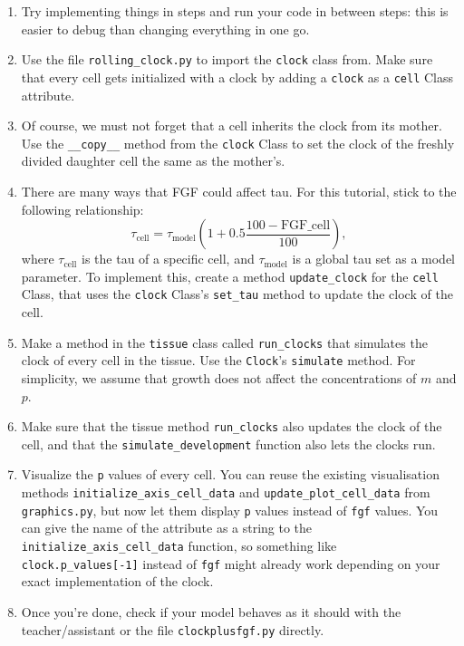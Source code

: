 \documentclass[
  letterpaper,
  DIV=11,
  numbers=noendperiod]{scrreprt}
\providecommand{\tightlist}{%
  \setlength{\itemsep}{0pt}\setlength{\parskip}{0pt}}\usepackage{longtable,booktabs,array}
\theoremstyle{definition}
\theoremstyle{remark}
\begin{document}
\begin{enumerate}
\def\labelenumi{\arabic{enumi}.}
\tightlist
\item
  Try implementing things in steps and run your code in between steps:
  this is easier to debug than changing everything in one go.
\item
  Use the file \texttt{rolling\_clock.py} to import the \texttt{clock}
  class from. Make sure that every cell gets initialized with a clock by
  adding a \texttt{clock} as a \texttt{cell} Class attribute.
\item
  Of course, we must not forget that a cell inherits the clock from its
  mother. Use the \texttt{\_\_copy\_\_} method from the \texttt{clock}
  Class to set the clock of the freshly divided daughter cell the same
  as the mother's.
\item
  There are many ways that FGF could affect tau. For this tutorial,
  stick to the following relationship:
  \[\tau_\text{cell}=\tau_\text{model}(1+0.5\frac{100-\text{FGF}\_\text{cell}}{100}),\]
  where \(\tau_\text{cell}\) is the tau of a specific cell, and
  \(\tau_\text{model}\) is a global tau set as a model parameter. To
  implement this, create a method \texttt{update\_clock} for the
  \texttt{cell} Class, that uses the \texttt{clock} Class's
  \texttt{set\_tau} method to update the clock of the cell.
\item
  Make a method in the \texttt{tissue} class called \texttt{run\_clocks}
  that simulates the clock of every cell in the tissue. Use the
  \texttt{Clock}'s \texttt{simulate} method. For simplicity, we assume
  that growth does not affect the concentrations of \(m\) and \(p\).
\item
  Make sure that the tissue method \texttt{run\_clocks} also updates the
  clock of the cell, and that the \texttt{simulate\_development}
  function also lets the clocks run.
\item
  Visualize the \texttt{p} values of every cell. You can reuse the
  existing visualisation methods \texttt{initialize\_axis\_cell\_data}
  and \texttt{update\_plot\_cell\_data} from \texttt{graphics.py}, but
  now let them display \texttt{p} values instead of \texttt{fgf} values.
  You can give the name of the attribute as a string to the
  \texttt{initialize\_axis\_cell\_data} function, so something like
  \texttt{clock.p\_values{[}-1{]}} instead of \texttt{fgf} might already
  work depending on your exact implementation of the clock.
\item
  Once you're done, check if your model behaves as it should with the
  teacher/assistant or the file \texttt{clockplusfgf.py} directly.
\end{enumerate}
\end{document}
